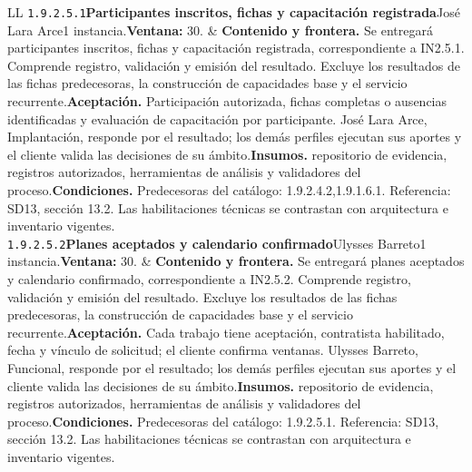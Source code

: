 \begin{longtable}{L{\tabcolsep\relax}L{\tabcolsep\relax}}
\texttt{1.\allowbreak{}9.\allowbreak{}2.\allowbreak{}5.\allowbreak{}1}\newline{}\textbf{Participantes inscritos, fichas y capacitación registrada}\newline{}José Lara Arce\newline{}1 instancia.\newline{}\textbf{Ventana:} 30. & \textbf{Contenido y frontera.} Se entregará participantes inscritos, fichas y capacitación registrada, correspondiente a IN2.5.1. Comprende registro, validación y emisión del resultado. Excluye los resultados de las fichas predecesoras, la construcción de capacidades base y el servicio recurrente.\newline{}\textbf{Aceptación.} Participación autorizada, fichas completas o ausencias identificadas y evaluación de capacitación por participante. José Lara Arce, Implantación, responde por el resultado; los demás perfiles ejecutan sus aportes y el cliente valida las decisiones de su ámbito.\newline{}\textbf{Insumos.} repositorio de evidencia, registros autorizados, herramientas de análisis y validadores del proceso.\newline{}\textbf{Condiciones.} Predecesoras del catálogo: 1.9.2.4.2,1.9.1.6.1. Referencia: SD13, sección 13.2. Las habilitaciones técnicas se contrastan con arquitectura e inventario vigentes.\\\hline
\texttt{1.\allowbreak{}9.\allowbreak{}2.\allowbreak{}5.\allowbreak{}2}\newline{}\textbf{Planes aceptados y calendario confirmado}\newline{}Ulysses Barreto\newline{}1 instancia.\newline{}\textbf{Ventana:} 30. & \textbf{Contenido y frontera.} Se entregará planes aceptados y calendario confirmado, correspondiente a IN2.5.2. Comprende registro, validación y emisión del resultado. Excluye los resultados de las fichas predecesoras, la construcción de capacidades base y el servicio recurrente.\newline{}\textbf{Aceptación.} Cada trabajo tiene aceptación, contratista habilitado, fecha y vínculo de solicitud; el cliente confirma ventanas. Ulysses Barreto, Funcional, responde por el resultado; los demás perfiles ejecutan sus aportes y el cliente valida las decisiones de su ámbito.\newline{}\textbf{Insumos.} repositorio de evidencia, registros autorizados, herramientas de análisis y validadores del proceso.\newline{}\textbf{Condiciones.} Predecesoras del catálogo: 1.9.2.5.1. Referencia: SD13, sección 13.2. Las habilitaciones técnicas se contrastan con arquitectura e inventario vigentes.\\\hline

\end{longtable}
